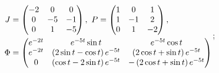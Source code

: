 \begin{enumsolsfull}
		\item \( \begin{aligned} J &= \begin{pmatrix} -2 & 0 & 0 \\ 0 & -5 & -1 \\ 0 & 1 & -5 \end{pmatrix}, ~ P = \begin{pmatrix} 1 & 0 & 1 \\ 1 & -1 & 2 \\ 0 & 1 & -2 \end{pmatrix}, \\ \Phi &= \begin{pmatrix} e^{-2t} & e^{-5t} \sin{t} & e^{-5t} \cos{t} \\ e^{-2t} & \left( 2 \sin{t} - \cos{t} \right) e^{-5t} & \left( 2 \cos{t} + \sin{t} \right) e^{-5t} \\ 0 & \left( \cos{t} - 2\sin{t} \right) e^{-5t} & -\left( 2 \cos{t} + \sin{t} \right) e^{-5t} \end{pmatrix} \end{aligned} \); %

\end{enumsolsfull}
